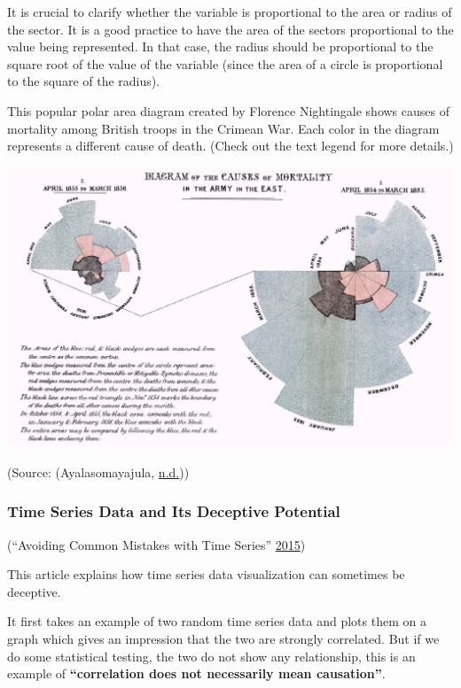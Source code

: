 \documentclass[]{book}
\begin{document}
It is crucial to clarify whether the variable is proportional to the area or radius of the sector. It is a good practice to have the area of the sectors proportional to the value being represented. In that case, the radius should be proportional to the square root of the value of the variable (since the area of a circle is proportional to the square of the radius).

This popular polar area diagram created by Florence Nightingale shows causes of mortality among British troops in the Crimean War. Each color in the diagram represents a different cause of death. (Check out the text legend for more details.)

\includegraphics{images/aya-polar.jpg}

(Source: (Ayalasomayajula, \protect\hyperlink{ref-aya-time-series}{n.d.}))

\hypertarget{time-series-data-and-its-deceptive-potential}{%
\subsubsection{Time Series Data and Its Deceptive Potential}\label{time-series-data-and-its-deceptive-potential}}

(``Avoiding Common Mistakes with Time Series'' \protect\hyperlink{ref-TimeSeries}{2015})

This article explains how time series data visualization can sometimes be deceptive.

It first takes an example of two random time series data and plots them on a graph which gives an impression that the two are strongly correlated. But if we do some statistical testing, the two do not show any relationship, this is an example of \textbf{``correlation does not necessarily mean causation''}.
\end{document}
